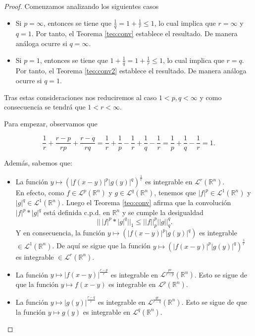\begin{proof}

Comenzamos analizando los siguientes casos
\begin{itemize}
    \item Si $p = \infty$, entonces se tiene que $\frac{1}{q}=1+\frac{1}{r} \leq 1$, lo cual implica que $r=\infty$ y $q=1$. Por tanto, el Teorema \ref{teo:conv} establece el resultado.
    De manera análoga ocurre si $q = \infty$.
    
\item Si $p = 1$, entonces se tiene que $1+\frac{1}{q}=1+\frac{1}{r} \leq 1$, lo cual implica que $r=q$. Por tanto, el Teorema \ref{teo:conv2} establece el resultado.
    De manera análoga ocurre si $q = 1$.
\end{itemize}

\noindent Tras estas consideraciones nos reduciremos al caso $1<p,q < \infty$ y como consecuencia se tendrá que $1<r<\infty$.

\noindent Para empezar, observamos que

\begin{equation}
        \frac{1}{r}+\frac{r-p}{rp}+\frac{r-q}{rq} = \frac{1}{r}+\frac{1}{p}-\frac{1}{r}+\frac{1}{q}-\frac{1}{r} = \frac{1}{p}+\frac{1}{q}-\frac{1}{r} = 1.
\end{equation}

\noindent Además, sabemos que:
\begin{itemize}
    \item La función $y \mapsto (|f(x-y)|^{p}|g(y)|^{q})^\frac{1}{r}$ es integrable en $\mathscr{L}^r(\mathbb{R}^n)$.\\
    En efecto, como $f \in \mathscr{L}^p(\mathbb{R}^n)$ y $g \in \mathscr{L}^q(\mathbb{R}^n)$, tenemos que $|f|^p \in \mathscr{L}^1(\mathbb{R}^n)$ y $|g|^q \in \mathscr{L}^1(\mathbb{R}^n)$. Luego el Teorema \ref{teo:conv} afirma que la convolución $|f|^p*|g|^q$ está definida c.p.d. en $\mathbb{R}^n$ y se cumple la desigualdad
    \begin{equation}
        ||\,|f|^p*|g|^q||_1 \leq ||f||_{p}^{p}||g||_{q}^{q}.
    \end{equation}
    Y en consecuencia, la función $y \mapsto (|f(x-y)|^{p}|g(y)|^{q})$ es integrable $\in \mathscr{L}^1(\mathbb{R}^n)$. De aquí se sigue que la función $y \mapsto (|f(x-y)|^{p}|g(y)|^{q})^\frac{1}{r}$ es integrable $\in \mathscr{L}^r(\mathbb{R}^n)$.
    \item La función $y \mapsto |f(x-y)|^\frac{r-p}{r}$ es integrable en $\mathscr{L}^{\frac{pr}{r-p}}(\mathbb{R}^n)$.
    Esto se sigue de que la función $y \mapsto f(x-y)$ es integrable en $\mathscr{L}^{p}(\mathbb{R}^n)$.
    \item La función $y \mapsto |g(y)|^\frac{r-q}{r}$ es integrable en $\mathscr{L}^{\frac{qr}{r-q}}(\mathbb{R}^n)$. Esto se sigue de que la función $y \mapsto g(y)$ es integrable en $\mathscr{L}^{q}(\mathbb{R}^n)$.
\end{itemize}


\end{proof}
